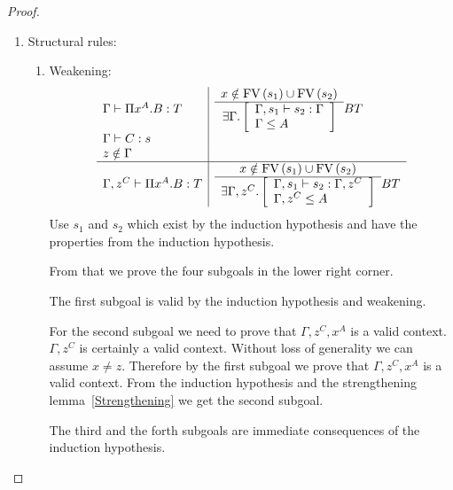 \begin{theorem}
\begin{proof}
{\begin{enumerate}
            \item Structural rules:
            \begin{enumerate}
                \item Weakening:
                $$
                \begin{array}{l|l}
                    \Gamma \vdash \Pi x^A. B: T
                    &
                    \begin{array}{c}  x \notin \text{FV}\, (s_1) \cup \text{FV}\, (s_2)  \\ \hline  \exists \Gamma. \left[ \begin{array}{l} \Gamma,s_1 \vdash s_2 : \Gamma \\ \Gamma \le A \end{array} \right] \end{array} B T
                    \\
                    \Gamma \vdash C: s
                    \\
                    z \notin \Gamma
                    \\
                    \hline
                    \Gamma,z^C \vdash \Pi x^A. B: T
                    &
                    \begin{array}{c}  x \notin \text{FV}\, (s_1) \cup \text{FV}\, (s_2)  \\ \hline  \exists \Gamma,z^C. \left[ \begin{array}{l} \Gamma,s_1 \vdash s_2 : \Gamma,z^C \\ \Gamma,z^C \le A \end{array} \right] \end{array} B T
                \end{array}
                $$
                Use $s_1$ and $s_2$ which exist by the induction hypothesis and
                    have the properties from the induction hypothesis.

                    From that we prove the four subgoals in the lower right
                    corner.

                    The first subgoal is valid by the induction hypothesis and
                    weakening.

                    For the second subgoal we need to prove that $\Gamma,z^C,
                    x^A$ is a valid context. $\Gamma,z^C$ is certainly a valid
                    context. Without loss of generality we can assume $x \ne z$.
                    Therefore by the first subgoal we prove that
                    $\Gamma,z^C,x^A$ is a valid context. From the induction
                    hypothesis and the strengthening lemma~\ref{Strengthening}
                    we get the second subgoal.

                    The third and the forth subgoals are immediate consequences
                    of the induction hypothesis.


\end{enumerate}
\end{enumerate}}
\end{proof}
\end{theorem}
